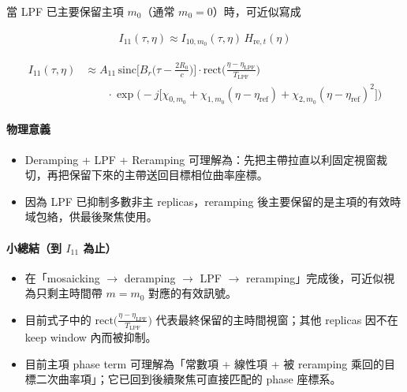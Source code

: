 \documentclass[10pt]{article}
\providecommand{\tightlist}{%
  \setlength{\itemsep}{0pt}\setlength{\parskip}{0pt}}
\begin{document}
當 LPF 已主要保留主項 \(m_0\)（通常 \(m_0=0\)）時，可近似寫成

\begin{equation}
\begin{aligned}
I_{11}(\tau,\eta)\approx I_{10,m_0}(\tau,\eta)\,H_{\mathrm{re},t}(\eta)
\end{aligned}
\end{equation}

\begin{equation}
\begin{aligned}
I_{11}(\tau,\eta)
&\approx
A_{11}\,
\mathrm{sinc}\biggl[ B_r\biggl( \tau-\frac{2R_0}{c} \biggr) \biggr]
\cdot \mathrm{rect}\biggl( \frac{\eta-\eta_{\mathrm{LPF}}}{T_{\mathrm{LPF}}} \biggr)\\
&\qquad \cdot
\exp\biggl( -j\biggl[ \chi_{0,m_0}+\chi_{1,m_0}(\eta-\eta_{\mathrm{ref}})+\chi_{2,m_0}(\eta-\eta_{\mathrm{ref}})^2 \biggr] \biggr)
\end{aligned}
\end{equation}

\hypertarget{ux7269ux7406ux610fux7fa9-1}{%
\paragraph{物理意義}\label{ux7269ux7406ux610fux7fa9-1}}

\begin{itemize}
\tightlist
\item
  Deramping + LPF + Reramping
  可理解為：先把主帶拉直以利固定視窗裁切，再把保留下來的主帶送回目標相位曲率座標。
\item
  因為 LPF 已抑制多數非主 replicas，reramping
  後主要保留的是主項的有效時域包絡，供最後聚焦使用。
\end{itemize}

\hypertarget{ux5c0fux7e3dux7d50ux5230-i_11-ux70baux6b62}{%
\paragraph{\texorpdfstring{小總結（到 \(I_{11}\)
為止）}{小總結（到 I\_\{11\} 為止）}}\label{ux5c0fux7e3dux7d50ux5230-i_11-ux70baux6b62}}

\begin{itemize}
\tightlist
\item
  在「mosaicking \(\rightarrow\) deramping \(\rightarrow\) LPF
  \(\rightarrow\) reramping」完成後，可近似視為只剩主時間帶 \(m=m_0\)
  對應的有效訊號。
\item
  目前式子中的
  \(\mathrm{rect}\biggl( \frac{\eta-\eta_{\mathrm{LPF}}}{T_{\mathrm{LPF}}} \biggr)\)
  代表最終保留的主時間視窗；其他 replicas 因不在 keep window
  內而被抑制。
\item
  目前主項 phase term 可理解為「常數項 + 線性項 + 被 reramping
  乘回的目標二次曲率項」；它已回到後續聚焦可直接匹配的 phase 座標系。
\end{itemize}
\end{document}
